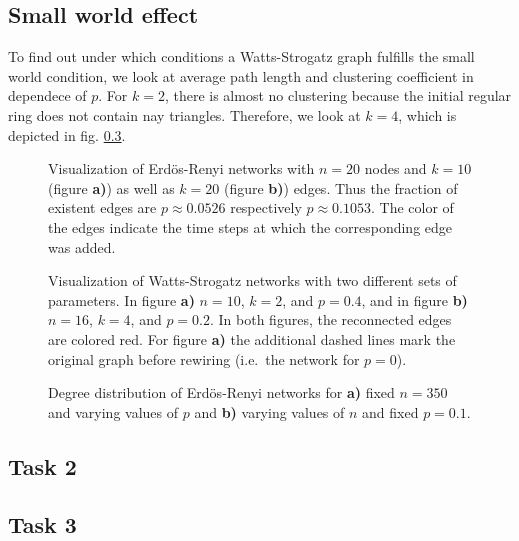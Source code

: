 \documentclass{scrartcl}
\begin{document}
\subsection{Small world effect}
To find out under which conditions a Watts-Strogatz graph fulfills the small world condition, we look at average path length and clustering coefficient in dependece of $p$. For $k=2$, there is almost no clustering because the initial regular ring does not contain nay triangles. Therefore, we look at $k=4$, which is depicted in fig. \ref{}.

\begin{figure}
    \centering
    \def\svgwidth{0.8\columnwidth}
    
    \caption{Visualization of Erdös-Renyi networks with $n=20$ nodes and $k = 10$ (figure \textbf{a)}) as well as $k = 20$ (figure \textbf{b)}) edges. Thus the fraction of existent edges are $p \approx 0.0526$ respectively $p \approx 0.1053$. The color of the edges indicate the time steps at which the corresponding edge was added.}
    \label{11_er}
\end{figure}

\begin{figure}
    \centering
    \def\svgwidth{0.8\columnwidth}
    
    \caption{Visualization of Watts-Strogatz networks with two different
        sets of parameters. In figure \textbf{a)} $n=10$, $k=2$, and
        $p=0.4$, and in figure \textbf{b)} $n=16$, $k=4$, and $p=0.2$. In
        both figures, the reconnected edges are colored red. For figure
        \textbf{a)} the additional dashed lines mark the original graph
    before rewiring (i.e.\ the network for $p=0$).}
    \label{13_ws}
\end{figure}

\begin{figure}
    \caption{Degree distribution of Erdös-Renyi networks for \textbf{a)} fixed $n=350$ and varying values of $p$ and \textbf{b)} varying values of $n$ and fixed $p=0.1$.}
\end{figure}

\subsection{Task 2}
\subsection{Task 3}
\end{document}
